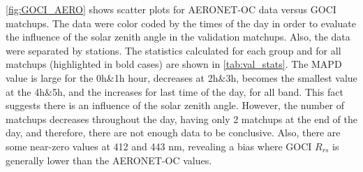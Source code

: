 \documentclass[onecolumn,3p,letterpaper,11pt]{elsarticle}
\begin{document}
\autoref{fig:GOCI_AERO} shows scatter plots for AERONET-OC data versus GOCI matchups. The data were color coded by the times of the day in order to evaluate the influence of the solar zenith angle in the validation matchups. Also, the data were separated by stations. The statistics calculated for each group and for all matchups (highlighted in bold cases) are shown in \autoref{tab:val_stats}. The MAPD value is large for the 0h\&1h hour, decreases at 2h\&3h, becomes the smallest value at the 4h\&5h, and the increases for last time of the day, for all band. This fact suggests there is an influence of the solar zenith angle. However, the number of matchups decreases throughout the day, having only 2 matchups at the end of the day, and therefore, there are not enough data to be conclusive. Also, there are some near-zero values at 412 and 443 nm, revealing a bias where GOCI $R_{rs}$ is generally lower than the AERONET-OC values.
\end{document}
